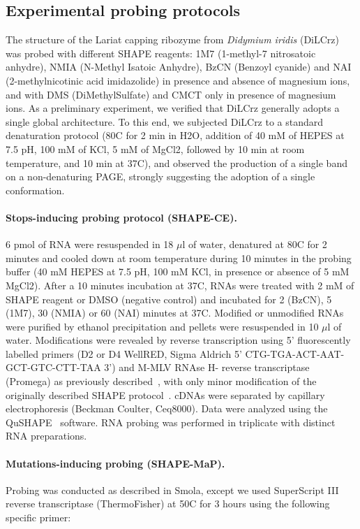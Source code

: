 \documentclass[a4,center,fleqn]{NAR}
\begin{document}
\subsection*{Experimental probing protocols}
The structure of the Lariat capping ribozyme from \textit{Didymium iridis }(DiLCrz) was probed with different SHAPE reagents: 1M7 (1-methyl-7 nitrosatoic anhydre), NMIA (N-Methyl Isatoic Anhydre), BzCN (Benzoyl cyanide) and NAI (2-methylnicotinic acid imidazolide) in presence and absence of magnesium ions, and with DMS (DiMethylSulfate) and CMCT only in presence of magnesium ions.
As a preliminary experiment, we verified that DiLCrz generally adopts a single global architecture. To this end, we subjected DiLCrz to a standard denaturation protocol (80\degree{}C for 2 min in H2O, addition of 40 mM of HEPES at 7.5 pH, 100 mM of KCl, 5 mM of MgCl2, followed by 10 min at room temperature, and 10 min at 37\degree{}C), and observed the production of a single band on a non-denaturing PAGE, strongly suggesting the adoption of a single conformation.

\paragraph{Stops-inducing probing protocol (SHAPE-CE).} 
6 pmol of RNA were resuspended in 18 $\mu$l of water, denatured at 80\degree{}C for 2 minutes and cooled down at room temperature during 10 minutes in the probing buffer (40 mM HEPES at 7.5 pH, 100 mM KCl, in presence or absence of 5 mM MgCl2). After a 10 minutes incubation at 37\degree{}C, RNAs were treated with 2 mM of SHAPE reagent or DMSO (negative control) and incubated for 2 (BzCN), 5 (1M7), 30 (NMIA) or 60 (NAI) minutes at 37\degree{}C. Modified or unmodified RNAs were purified by ethanol precipitation and pellets were resuspended in 10 $\mu$l of water.
Modifications were revealed by reverse transcription using 5’ fluorescently labelled primers (D2 or D4 WellRED, Sigma Aldrich 5’ CTG-TGA-ACT-AAT-GCT-GTC-CTT-TAA 3’) and M-MLV RNAse H- reverse transcriptase (Promega) as previously described~\cite{Deforges2017}, with only minor modification of the originally described SHAPE protocol~\cite{Wilkinson2006}. cDNAs were separated by capillary electrophoresis (Beckman Coulter, Ceq8000). Data were analyzed using the  QuSHAPE~\cite{Karabiber2013} software. RNA probing was performed in triplicate with distinct RNA preparations.

\paragraph{Mutations-inducing probing (SHAPE-MaP).}
Probing was conducted as described in Smola\etal\cite{Smola2015}, except we used SuperScript III reverse transcriptase (ThermoFisher) at 50\degree{}C for 3 hours using the following specific primer: 
\end{document}

